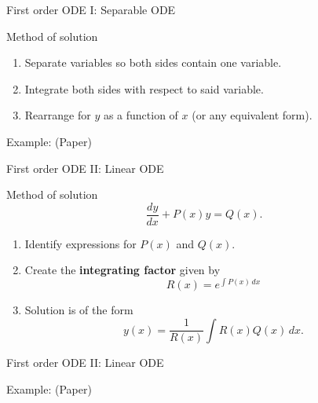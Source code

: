\begin{frame}{First order ODE I: Separable ODE}
    \begin{block}{Method of solution} \pause
    \begin{enumerate}
        \item Separate variables so both sides contain one variable. \pause
        
        \item Integrate both sides with respect to said variable. \pause
        
        \item Rearrange for \(y\) as a function of \(x\) (or any equivalent form). \pause
    \end{enumerate}
    \end{block}
    
    \begin{exampleblock}{Example: (Paper)}
    \end{exampleblock}
\end{frame}

\begin{frame}{First order ODE II: Linear ODE}
    \begin{block}{Method of solution}
    \[\frac{dy}{dx} + P(x) y = Q(x).\]
    \pause
    \begin{enumerate}
        \item Identify expressions for \(P(x)\) and \(Q(x)\). \pause
        
        \item Create the \textbf{integrating factor} given by \[ R(x) = e^{\int P(x)\,dx}\] \pause
        
        \item Solution is of the form \[ y(x) = \frac{1}{R(x)} \int R(x) Q(x)\,dx.\]
    \end{enumerate}
    \end{block}
\end{frame}

\begin{frame}{First order ODE II: Linear ODE}
    \begin{exampleblock}{Example: (Paper)}
    \end{exampleblock}
\end{frame}

